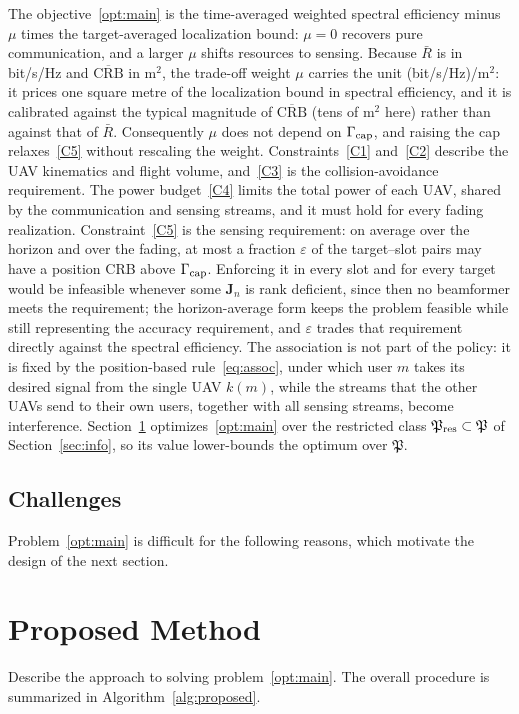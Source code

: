 \documentclass[conference]{IEEEtran}
\begin{document}
The objective~\eqref{opt:main} is the time-averaged weighted spectral efficiency minus $\mu$ times the target-averaged localization bound: $\mu=0$ recovers pure communication, and a larger $\mu$ shifts resources to sensing. Because $\bar R$ is in bit/s/Hz and $\overline{\mathrm{CRB}}$ in m$^2$, the trade-off weight $\mu$ carries the unit (bit/s/Hz)/m$^2$: it prices one square metre of the localization bound in spectral efficiency, and it is calibrated against the typical magnitude of $\overline{\mathrm{CRB}}$ (tens of m$^2$ here) rather than against that of $\bar R$. Consequently $\mu$ does not depend on $\Gamma_{\rm cap}$, and raising the cap relaxes~\eqref{C5} without rescaling the weight. Constraints~\eqref{C1} and~\eqref{C2} describe the UAV kinematics and flight volume, and~\eqref{C3} is the collision-avoidance requirement. The power budget~\eqref{C4} limits the total power of each UAV, shared by the communication and sensing streams, and it must hold for every fading realization. Constraint~\eqref{C5} is the sensing requirement: on average over the horizon and over the fading, at most a fraction $\varepsilon$ of the target--slot pairs may have a position CRB above $\Gamma_{\rm cap}$. Enforcing it in every slot and for every target would be infeasible whenever some $\mathbf J_n$ is rank deficient, since then no beamformer meets the requirement; the horizon-average form keeps the problem feasible while still representing the accuracy requirement, and $\varepsilon$ trades that requirement directly against the spectral efficiency. The association is not part of the policy: it is fixed by the position-based rule~\eqref{eq:assoc}, under which user $m$ takes its desired signal from the single UAV $k(m)$, while the streams that the other UAVs send to their own users, together with all sensing streams, become interference. Section~\ref{sec:method} optimizes~\eqref{opt:main} over the restricted class $\mathfrak P_{\rm res}\subset\mathfrak P$ of Section~\ref{sec:info}, so its value lower-bounds the optimum over $\mathfrak P$.


\subsection{Challenges}

Problem~\eqref{opt:main} is difficult for the following reasons, which motivate the design of the next section.

\section{Proposed Method}\label{sec:method}
Describe the approach to solving problem~\eqref{opt:main}. The overall procedure is summarized in Algorithm~\ref{alg:proposed}.
\end{document}
